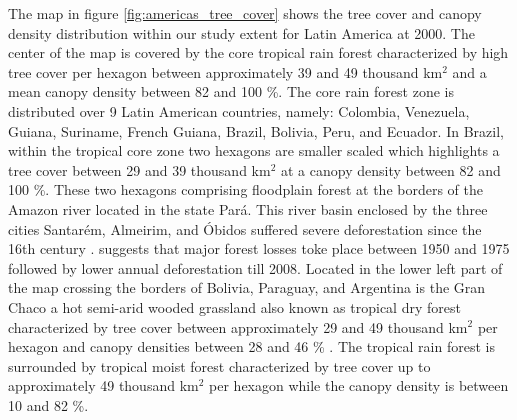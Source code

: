 			The map in figure \ref{fig:americas_tree_cover} shows the tree cover and canopy density distribution within our study extent for Latin America at 2000. The center of the map is covered by the core tropical rain forest characterized by high tree cover per hexagon between approximately 39 and 49 thousand km$^2$ and a mean canopy density between 82 and 100 \%. The core rain forest zone is distributed over 9 Latin American countries, namely: Colombia, Venezuela, Guiana, Suriname, French Guiana, Brazil, Bolivia, Peru, and Ecuador. In Brazil, within the tropical core zone two hexagons are smaller scaled which highlights a tree cover between 29 and 39 thousand km$^2$ at a canopy density between 82 and 100 \%. These two hexagons comprising floodplain forest at the borders of the Amazon river located in the state Par\'{a}. This river basin enclosed by the three cities Santar\'{e}m, Almeirim, and \'{O}bidos suffered severe deforestation since the 16th century \citep{Reno2011}. \citeauthor{Reno2011} suggests that major forest losses toke place between 1950 and 1975 followed by lower annual deforestation till 2008. Located in the lower left part of the map crossing the borders of Bolivia, Paraguay, and Argentina is the Gran Chaco a hot semi-arid wooded grassland also known as tropical dry forest characterized by tree cover between approximately 29 and 49 thousand km$^2$ per hexagon and canopy densities between 28 and 46 \% \citep{Caldas2013}. The tropical rain forest is surrounded by tropical moist forest characterized by tree cover up to approximately 49 thousand km$^2$ per hexagon while the canopy density is between 10 and 82 \%.
